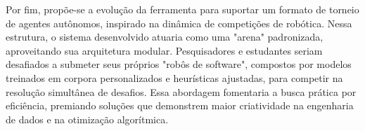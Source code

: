 Por fim, propõe-se a evolução da ferramenta para suportar um formato de torneio de agentes autônomos, inspirado na dinâmica de competições de robótica. Nessa estrutura, o sistema desenvolvido atuaria como uma "arena" padronizada, aproveitando sua arquitetura modular. Pesquisadores e estudantes seriam desafiados a submeter seus próprios "robôs de software", compostos por modelos treinados em corpora personalizados e heurísticas ajustadas, para competir na resolução simultânea de desafios. Essa abordagem fomentaria a busca prática por eficiência, premiando soluções que demonstrem maior criatividade na engenharia de dados e na otimização algorítmica.